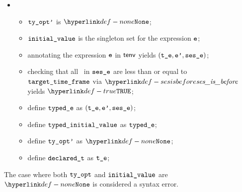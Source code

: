 \begin{itemize}
  \item {}
  \begin{itemize}
    \item $\tyoptp$ is $\None$;
    \item $\initialvalue$ is the singleton set for the expression $\ve$;
    \item annotating the expression $\ve$ in $\tenv$ yields $(\vte, \vep, \vsese)$\ProseOrTypeError;
    \item checking that all \timeframesterm\ in $\vsese$ are less than or equal to \\
          $\vtargettimeframe$ via $\sesisbefore$ yields $\True$\ProseOrTypeError;
    \item define $\typede$ as $(\vte, \vep, \vsese)$;
    \item define $\typedinitialvalue$ as $\typede$;
    \item define $\tyoptp$ as $\None$;
    \item define $\declaredt$ as $\vte$;
  \end{itemize}
\end{itemize}
The case where both $\tyopt$ and $\initialvalue$ are $\None$ is considered a syntax error.

\FormallyParagraph
\begin{mathpar}
\end{mathpar}

